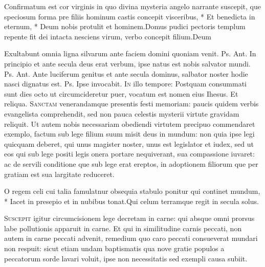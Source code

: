 \begin{multicols*}{2}
\begin{responsory-final}
{Confirmatum est cor virginis in quo divina mysteria angelo narrante suscepit, que speciosum forma pre filiis hominum castis concepit visceribus, * Et benedicta in eternum, * Deum nobis protulit et hominem.}{Domus pudici pectoris templum repente fit dei intacta nesciens virum, verbo concepit filium.}{Deum}
\end{responsory-final}
 Exultabunt omnia ligna silvarum ante faciem domini quoniam venit. {\color{Red} Ps.}  {\color{Red} Ant.} In principio et ante secula deus erat verbum, ipse natus est nobis salvator mundi. {\color{Red} Ps.}  {\color{Red} Ant.} Ante luciferum genitus et ante secula dominus, salbator noster hodie nasci dignatus est. {\color{Red} Ps.}  \V Ipse invocabit.
\lettrine[lines=2]{\zallmancaps \color{Red} I}{n} illo tempore: Postquam consummati sunt dies octo ut circumcideretur puer, vocatum est nomen eius Ihesus. Et reliqua.
 
\lettrine[lines=2]{\zallmancaps \color{Blue} S}{anctam} venerandamque presentis festi memoriam: paucis quidem verbis evangelista comprehendit, sed non pauca celestis mysterii virtute gravidam reliquit. Ut autem nobis necessariam obediendi virtutem precipuo commendaret exemplo, factum sub lege filium suum misit deus in mundum: non quia ipse legi quicquam deberet, qui unus magister noster, unus est legislator et iudex, sed ut eos qui sub lege positi legis onera portare nequiverant, sua compassione iuvaret: ac de servili conditione que sub lege erat ereptos, in adoptionem filiorum que per gratiam est sua largitate reduceret.
\begin{responsory}
{O regem celi cui talia famulatnur obsequia stabulo ponitur qui continet mundum, * Iacet in presepio et in nubibus tonat.}{Qui celum terramque regit in secula solus.}
\end{responsory}
\lettrine[lines=2]{\zallmancaps \color{Red} S}{uscepit} igitur circumcisionem lege decretam in carne: qui absque omni prorsus labe pollutionis apparuit in carne. Et qui in similitudine carnis peccati, non autem in carne peccati advenit, remedium quo caro peccati consueverat mundari non respuit: sicut etiam undam baptismatis qua nove gratie populos a peccatorum sorde lavari voluit, ipse non necessitatis sed exempli causa subiit.

\end{multicols*}
